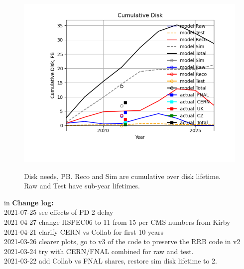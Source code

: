 \documentclass[12pt]{article}
\begin{document}
\begin{figure}
\centering\includegraphics[height=0.4\textwidth]{Cumulative-Disk}\label{CumulativeDisk}
\caption{Disk needs, PB.  Reco and Sim are cumulative over disk lifetime.  Raw and Test have sub-year lifetimes.}
\end{figure}
 in\pagebreak 
 {\bf Change log:}\\
2021-07-25 see effects of PD 2 delay\\2021-04-27 change HSPEC06 to 11 from 15 per CMS numbers from Kirby\\2021-04-21 clarify CERN vs Collab for first 10 years\\2021-03-26 clearer plots, go to v3 of the code to preserve the RRB code in v2\\2021-03-24 try with CERN/FNAL combined for raw and test.\\2021-03-22 add Collab vs FNAL shares, restore sim disk lifetime to 2.\\
\end{document}
